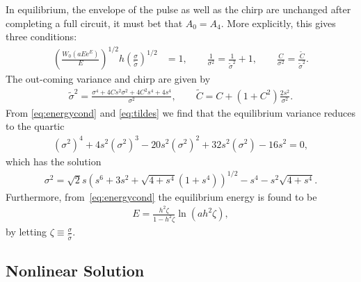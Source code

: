 \documentclass[12pt]{article}
\begin{document}
In equilibrium, the envelope of the pulse as well as the chirp are unchanged after completing a full circuit, it must bet that $A_0 = A_4$.
More explicitly, this gives three conditions:
\begin{align}
\label{eq:energycond}
	\left( \frac{W_0(a E \textrm{e}^E)}{E} \right)^{1/2} h \left( \frac{\sigma}{\widetilde{\sigma}} \right)^{1/2} &= 1, \qquad
	\frac{1}{\sigma^2} = \frac{1}{\widetilde{\sigma}^2} + 1, \qquad
	\frac{C}{\sigma^2} = \frac{\widetilde{C}}{\widetilde{\sigma}^2}.
\end{align}
The out-coming variance and chirp are given by \cite{agrawal2013}
\begin{align}
\label{eq:tildes}
	\widetilde{\sigma}^2 = \frac{\sigma^4 + 4 C s^2 \sigma^2 + 4 C^2 s^4 +4s^4}{\sigma^2}, \qquad
	\widetilde{C} = C + \left( 1 + C^2 \right) \frac{2s^2}{\sigma^2}.
\end{align}
From \eqref{eq:energycond} and \eqref{eq:tildes} we find that the equilibrium variance reduces to the quartic
\begin{align*}
\left( \sigma^2 \right)^4 + 4 s^2 \left( \sigma^2 \right)^3 - 20 s^2 \left( \sigma^2 \right)^2 + 32 s^2 \left( \sigma^2 \right) - 16 s^2 = 0,
\end{align*}
which has the solution
\begin{align*}
\sigma^2 = \sqrt{2} s \left( s^6 + 3s^2 + \sqrt{4 + s^4}(1 + s^4) \right)^{1/2} - s^4 - s^2 \sqrt{4 + s^4}.
\end{align*}
Furthermore, from~\eqref{eq:energycond} the equilibrium energy is found to be
\begin{align}
	\label{eq:equilenergy}
	E = \frac{h^2 \zeta}{1 - h^2 \zeta} \ln \left( a h^2 \zeta \right),
\end{align}
by letting $\displaystyle \zeta \equiv \frac{\sigma}{\widetilde{\sigma}}$.

\subsection{Nonlinear Solution}
\end{document}
